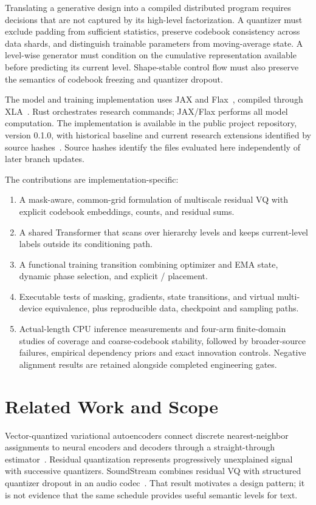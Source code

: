 \documentclass[11pt,a4paper]{article}
\begin{document}
Translating a generative design into a compiled distributed program requires
decisions that are not captured by its high-level factorization. A quantizer
must exclude padding from sufficient statistics, preserve codebook consistency
across data shards, and distinguish trainable parameters from moving-average
state. A level-wise generator must condition on the cumulative representation
available before predicting its current level. Shape-stable control flow must
also preserve the semantics of codebook freezing and quantizer dropout.

The model and training implementation uses JAX and Flax~\citep{jax,flax,flaxscan},
compiled through XLA~\citep{xla}. Rust orchestrates research commands; JAX/Flax performs all model computation. The
implementation is
available in the public project repository, version 0.1.0, with historical baseline
 and current research extensions identified by source hashes~\citep{localrepo}. Source hashes
identify the files evaluated here independently of later branch updates.

\begin{samepage}
The contributions are implementation-specific:
\begin{enumerate}
  \item A mask-aware, common-grid formulation of multiscale residual VQ with
  explicit codebook embeddings, counts, and residual sums.
  \item A shared Transformer that scans over hierarchy levels and keeps
  current-level labels outside its conditioning path.
  \item A functional training transition combining optimizer and EMA state,
  dynamic phase selection, and explicit / placement.
  \item Executable tests of masking, gradients, state transitions, and virtual
  multi-device equivalence, plus reproducible data, checkpoint and sampling paths.
  \item Actual-length CPU inference measurements and four-arm finite-domain
  studies of coverage and coarse-codebook stability, followed by broader-source
  failures, empirical dependency priors and exact innovation controls. Negative
  alignment results are retained alongside completed engineering gates.
\end{enumerate}
\end{samepage}



\section{Related Work and Scope}
Vector-quantized variational autoencoders connect discrete nearest-neighbor
assignments to neural encoders and decoders through a straight-through
estimator~\citep{oord2017vqvae}. Residual quantization represents progressively
unexplained signal with successive quantizers. SoundStream combines residual
VQ with structured quantizer dropout in an audio codec~\citep{zeghidour2021soundstream}.
That result motivates a design pattern; it is not evidence that the same
schedule provides useful semantic levels for text.
\end{document}
